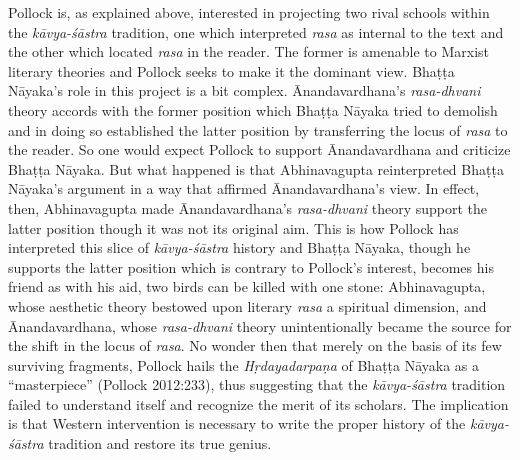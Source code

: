Pollock is, as explained above, interested in projecting two rival schools within the \textsl{kāvya-śāstra} tradition, one which interpreted \textsl{rasa} as internal to the text and the other which located \textsl{rasa} in the reader. The former is amenable to Marxist literary theories and Pollock seeks to make it the dominant view. Bhaṭṭa Nāyaka's role in this project is a bit complex. Ānandavardhana's \textsl{rasa-dhvani} theory accords with the former position which Bhaṭṭa Nāyaka tried to demolish and in doing so established the latter position by transferring the locus of \textsl{rasa} to the reader. So one would expect Pollock to support Ānandavardhana and criticize Bhaṭṭa Nāyaka. But what happened is that Abhinavagupta reinterpreted Bhaṭṭa Nāyaka's argument in a way that affirmed Ānandavardhana's view. In effect, then, Abhinavagupta made Ānandavardhana's \textsl{rasa-dhvani} theory support the latter position though it was not its original aim. This is how Pollock has interpreted this slice of \textsl{kāvya-śāstra} history and Bhaṭṭa Nāyaka, though he supports the latter position which is contrary to Pollock's interest, becomes his friend as with his aid, two birds can be killed with one stone: Abhinavagupta, whose aesthetic theory bestowed upon literary \textsl{rasa} a spiritual dimension, and Ānandavardhana, whose \textsl{rasa-dhvani} theory unintentionally became the source for the shift in the locus of \textsl{rasa}. No wonder then that merely on the basis of its few surviving fragments, Pollock hails the \textsl{Hṛdayadarpaṇa} of Bhaṭṭa Nāyaka as a ``masterpiece'' (Pollock 2012:233), thus suggesting that the \textsl{kāvya-śāstra} tradition failed to understand itself and recognize the merit of its scholars. The implication is that Western intervention is necessary to write the proper history of the \textsl{kāvya-śāstra} tradition and restore its true genius.

